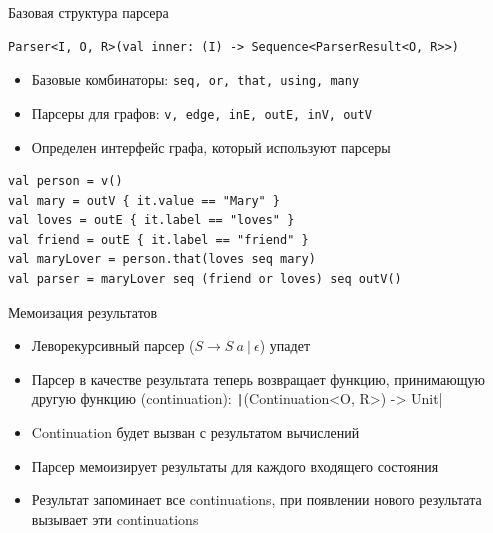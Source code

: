 \documentclass[aspectratio=169]{beamer}
\begin{document}
\begin{frame}[fragile]{Базовая структура парсера}
  \begin{verbatim}
Parser<I, O, R>(val inner: (I) -> Sequence<ParserResult<O, R>>)
  \end{verbatim}
  \begin{itemize}
    \item Базовые комбинаторы: \texttt{seq, or, that, using, many}
    \item Парсеры для графов: \texttt{v, edge, inE, outE, inV, outV}
    \item Определен интерфейс графа, который используют парсеры
  \end{itemize}
  \begin{verbatim}
val person = v()
val mary = outV { it.value == "Mary" }
val loves = outE { it.label == "loves" }
val friend = outE { it.label == "friend" }
val maryLover = person.that(loves seq mary)
val parser = maryLover seq (friend or loves) seq outV()
  \end{verbatim}
\end{frame}


\begin{frame}[fragile]{Мемоизация результатов}
  \begin{itemize}
    \item Леворекурсивный парсер ($S \to S\ a\ |\ \epsilon$) упадет

    \item Парсер в качестве результата теперь возвращает функцию, принимающую другую функцию (continuation): \texttt|(Continuation<O, R>) -> Unit|
    \item Continuation будет вызван с результатом вычислений

    \item Парсер мемоизирует результаты для каждого входящего состояния

    \item Результат запоминает все continuations, при появлении нового результата вызывает эти continuations
  \end{itemize}
\end{frame}
\end{document}
